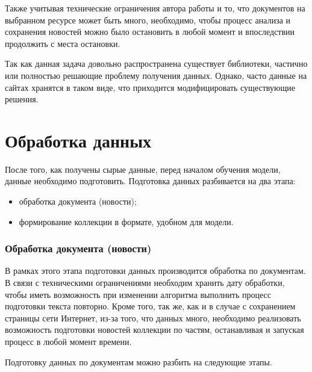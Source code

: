 Также учитывая технические ограничения автора работы и то, что документов на выбранном ресурсе может быть много, необходимо, чтобы процесс анализа и сохранения новостей можно было остановить в любой момент и впоследствии продолжить с места остановки.

Так как данная задача довольно распространена существует библиотеки, частично или полностью решающие проблему получения данных. Однако, часто данные на сайтах хранятся в таком виде, что приходится модифицировать существующие решения. 

%
\section{Обработка данных}

После того, как получены сырые данные, перед началом обучения модели, данные необходимо подготовить. Подготовка данных разбивается на два этапа:

\begin{itemize}
    \item обработка документа (новости);
    \item формирование коллекции в формате, удобном для модели.
\end{itemize}

%
\subsubsection{Обработка документа (новости)}

В рамках этого этапа подготовки данных производится обработка по документам. В связи с техническими ограничениями необходим хранить дату обработки, чтобы иметь возможность при изменении алгоритма выполнить процесс подготовки текста повторно. Кроме того, так же, как и в случае с сохранением страницы сети Интернет, из-за того, что данных много, необходимо реализовать возможность подготовки новостей коллекции по частям, останавливая и запуская процесс в любой момент времени.

Подготовку данных по документам можно разбить на следующие этапы.

